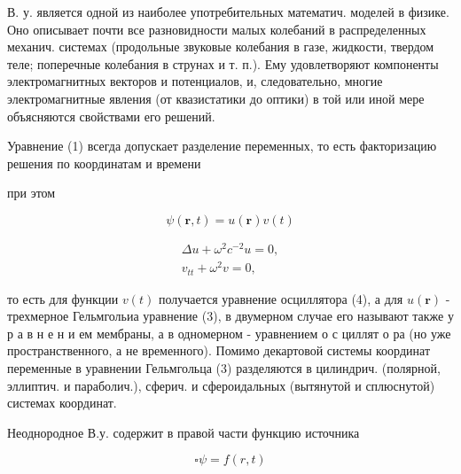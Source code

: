 \documentclass[10pt]{article}
\begin{document}
В. у. является одной из наиболее употребительных математич. моделей в физике. Оно описывает почти все разновидности малых колебаний в распределенных механич. системах (продольные звуковые колебания в газе, жидкости, твердом теле; поперечные колебания в струнах и т. п.). Ему удовлетворяют компоненты электромагнитных векторов и потенциалов, и, следовательно, многие электромагнитные явления (от квазистатики до оптики) в той или иной мере объясняются свойствами его решений.



Уравнение (1) всегда допускает разделение переменных, то есть факторизацию решения по координатам и времени



при этом



\[

\psi(\boldsymbol{r}, t)=u(\boldsymbol{r}) v(t)

\]



\[

\begin{gathered}

\Delta u+\omega^{2} c^{-2} u=0, \\

v_{t t}+\omega^{2} v=0,

\end{gathered}

\]



то есть для функции $v(t)$ получается уравнение осциллятора (4), а для $u(\boldsymbol{r})$ - трехмерное Гельмгольиа уравнение (3), в двумерном случае его называют также у р а в н е н и ем мембраны, а в одномерном - уравнением о с циллят о ра (но уже пространственного, а не временного). Помимо декартовой системы координат переменные в уравнении Гельмгольца (3) разделяются в цилиндрич. (полярной, эллиптич. и параболич.), сферич. и сфероидальных (вытянутой и сплюснутой) системах координат.



Неоднородное В.у. содержит в правой части функцию источника



\[

\square \psi=f(r, t)

\]
\end{document}
